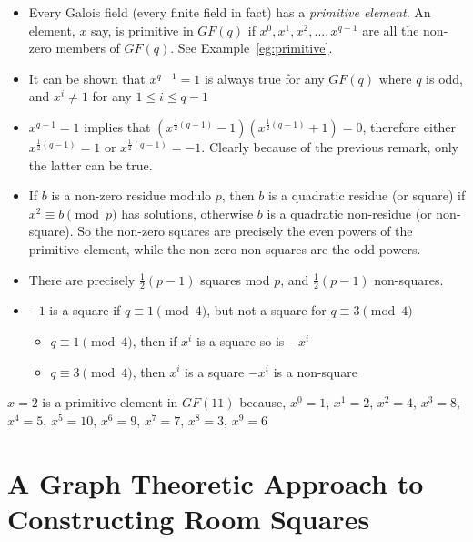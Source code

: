 \documentclass[11pt, a4paper]{book}\usepackage[]{graphicx}\usepackage[]{xcolor}
\newcounter{example}
\begin{document}
\begin{itemize}

\item{Every Galois field (every finite field in fact) has a
\emph{primitive element}.
An element, $x$ say, is primitive in $GF(q)$ if
$x^0, x^1, x^2, \ldots, x^{q - 1}$
are all the non-zero members of $GF(q)$.
See Example~\ref{eg:primitive}.}

\item{It can be shown
\cite{boseResolvableSeriesBalanced1947}
that $x^{q - 1} = 1$ is always true for any $GF(q)$ where $q$ is odd, and $x^i \neq 1$ for any $1 \leq i \leq q - 1$}

\item{$x^{q-1}=1$ implies that $(x^{\frac{1}{2}(q - 1)} - 1)(x^{\frac{1}{2}(q - 1)} + 1) = 0$, therefore either $x^{\frac{1}{2}(q - 1)} = 1$ or $x^{\frac{1}{2}(q - 1)} = -1$.
Clearly because of the previous remark, only the latter can be true.}

\item{If $b$ is a non-zero residue modulo $p$, then $b$ is a quadratic residue (or square) if $x^2 \equiv b \pmod p$ has solutions, otherwise $b$ is a quadratic non-residue (or non-square).
So the non-zero squares are precisely the even powers of the primitive element, while the non-zero non-squares are the odd powers.}

\item{There are precisely $\frac{1}{2}(p - 1)$ squares mod $p$, and $\frac{1}{2}(p - 1)$ non-squares.}

\item{$-1$ is a square if $q \equiv 1 \pmod 4$, but not a square for $q \equiv 3 \pmod 4$
\begin{itemize}
  \item{$q \equiv 1 \pmod 4$, then if $x^i$ is a square so is $-x^i$}
  \item{$q \equiv 3 \pmod 4$, then $x^i$ is a square $-x^i$ is a non-square}
\end{itemize}}

\end{itemize}

\begin{example}
$x = 2$ is a primitive element in $GF(11)$ because, $x^0 = 1$, $x^1 = 2$, $x^2 = 4$, $x^3 = 8$, $x^4 = 5$, $x^5 = 10$, $x^6 = 9$, $x^7 = 7$, $x^8 = 3$, $x^9 = 6$
\label{eg:primitive}
\end{example}


\chapter{A Graph Theoretic Approach to Constructing Room Squares}
\end{document}
